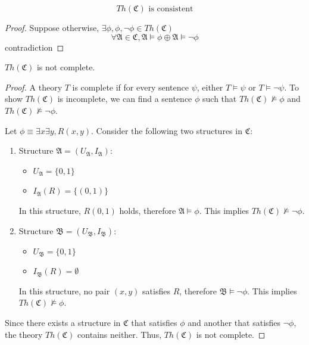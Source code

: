 \documentclass{article}
\newtheorem{lemma}[theorem]{Lemma}
\let\oldlemma\lemma
\let\endoldlemma\endlemma
\renewenvironment{lemma}
  {\begin{tcolorbox}[
      colback=green!8,
      colframe=green!50!black,
      boxrule=0.6pt,
      arc=2pt,
      left=6pt,right=6pt,top=4pt,bottom=4pt
    ]\oldlemma}
  {\endoldlemma\end{tcolorbox}}
\begin{document}
\begin{lemma}
    \[Th(\mathfrak{C}) \text{ is consistent}\]
\end{lemma}

\begin{proof}
    Suppose otherwise, $\exists \phi, \phi, \neg \phi \in Th(\mathfrak{C})$
    \[\forall \mathfrak{A} \in \mathfrak{C}, \mathfrak{A} \models \phi \oplus \mathfrak{A} \models \neg \phi\]
    contradiction
\end{proof}
\begin{lemma}
    $Th(\mathfrak{C})$ is not complete.
\end{lemma}

\begin{proof}
    A theory $T$ is complete if for every sentence $\psi$, either $T \models \psi$ or $T \models \neg \psi$. To show $Th(\mathfrak{C})$ is incomplete, we can find a sentence $\phi$ such that $Th(\mathfrak{C}) \not\models \phi$ and $Th(\mathfrak{C}) \not\models \neg \phi$.
    
    Let $\phi \equiv \exists x \exists y, R(x, y)$. Consider the following two structures in $\mathfrak{C}$:

    \begin{enumerate}
        \item Structure $\mathfrak{A} = (U_{\mathfrak{A}}, I_{\mathfrak{A}})$:
        \begin{itemize}
            \item $U_{\mathfrak{A}} = \{0, 1\}$
            \item $I_{\mathfrak{A}}(R) = \{(0,1)\}$
        \end{itemize}
        In this structure, $R(0,1)$ holds, therefore $\mathfrak{A} \models \phi$. This implies $Th(\mathfrak{C}) \not\models \neg \phi$.

        \item Structure $\mathfrak{B} = (U_{\mathfrak{B}}, I_{\mathfrak{B}})$:
        \begin{itemize}
            \item $U_{\mathfrak{B}} = \{0, 1\}$
            \item $I_{\mathfrak{B}}(R) = \emptyset$
        \end{itemize}
        In this structure, no pair $(x,y)$ satisfies $R$, therefore $\mathfrak{B} \models \neg \phi$. This implies $Th(\mathfrak{C}) \not\models \phi$.
    \end{enumerate}

    Since there exists a structure in $\mathfrak{C}$ that satisfies $\phi$ and another that satisfies $\neg \phi$, the theory $Th(\mathfrak{C})$ contains neither. Thus, $Th(\mathfrak{C})$ is not complete.
\end{proof}
\end{document}
